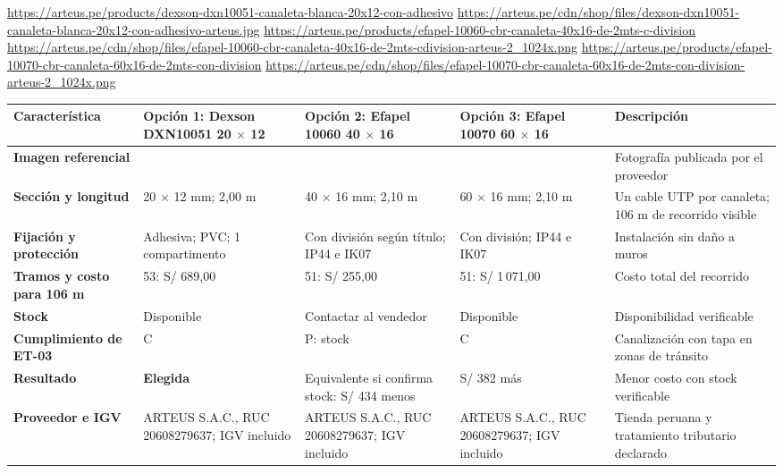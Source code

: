 \begin{landscape}
\urldef{\cotudb}\url{https://arteus.pe/products/dexson-dxn10051-canaleta-blanca-20x12-con-adhesivo}
\urldef{\cotudc}\url{https://arteus.pe/cdn/shop/files/dexson-dxn10051-canaleta-blanca-20x12-con-adhesivo-arteus.jpg}
\urldef{\cotudd}\url{https://arteus.pe/products/efapel-10060-cbr-canaleta-40x16-de-2mts-c-division}
\urldef{\cotude}\url{https://arteus.pe/cdn/shop/files/efapel-10060-cbr-canaleta-40x16-de-2mts-cdivision-arteus-2_1024x.png}
\urldef{\cotudf}\url{https://arteus.pe/products/efapel-10070-cbr-canaleta-60x16-de-2mts-con-division}
\urldef{\cotudg}\url{https://arteus.pe/cdn/shop/files/efapel-10070-cbr-canaleta-60x16-de-2mts-con-division-arteus-2_1024x.png}
\par\noindent\begin{minipage}{\linewidth}\formatofichas
{}\label{tab:cot-can}
\begin{tabularx}{\linewidth}{@{}>{\raggedright\arraybackslash}p{3.0cm}YYY>{\raggedright\arraybackslash}p{4.4cm}@{}}
\toprule
\textbf{Característica} & \textbf{Opción 1: Dexson DXN10051 20 $\times$ 12} & \textbf{Opción 2: Efapel 10060 40 $\times$ 16} & \textbf{Opción 3: Efapel 10070 60 $\times$ 16} & \textbf{Descripción}\\\midrule
\textbf{Imagen referencial} &  &  &  & Fotografía publicada por el proveedor\\
\textbf{Sección y longitud} & 20 $\times$ 12 mm; 2,00 m & 40 $\times$ 16 mm; 2,10 m & 60 $\times$ 16 mm; 2,10 m & Un cable UTP por canaleta; 106 m de recorrido visible\\
\textbf{Fijación y protección} & Adhesiva; PVC; 1 compartimento & Con división según título; IP44 e IK07 & Con división; IP44 e IK07 & Instalación sin daño a muros\\
\textbf{Tramos y costo para 106 m} & 53: S/ 689,00 & 51: S/ 255,00 & 51: S/ 1\,071,00 & Costo total del recorrido\\
\textbf{Stock} & Disponible & Contactar al vendedor & Disponible & Disponibilidad verificable\\
\textbf{Cumplimiento de ET-03} & C & P: stock & C & Canalización con tapa en zonas de tránsito\\
\textbf{Resultado} & \textbf{Elegida} & Equivalente si confirma stock: S/ 434 menos & S/ 382 más & Menor costo con stock verificable\\
\textbf{Proveedor e IGV} & ARTEUS S.A.C., RUC 20608279637; IGV incluido & ARTEUS S.A.C., RUC 20608279637; IGV incluido & ARTEUS S.A.C., RUC 20608279637; IGV incluido & Tienda peruana y tratamiento tributario declarado\\

\end{tabularx}
\end{minipage}
\end{landscape}
